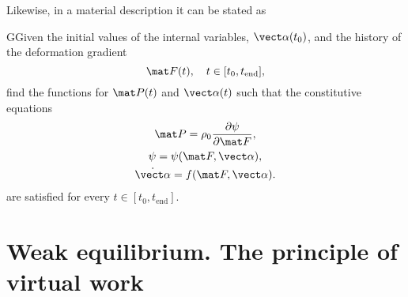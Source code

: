 Likewise, in a material description it can be stated as
    \begin{problem}
    GGiven the initial values of the internal variables, $\vect \alpha(t_0)$, and the history of the deformation gradient
    \begin{equation}
        \mat F(t),\quad t\in[t_0,t_\text{end}],
    \end{equation}
    find the functions for $\mat P(t)$ and $\vect \alpha(t)$ such that the constitutive equations
    \begin{gather}
        \mat P = \rho_0 \frac{\partial \psi}{\partial \mat F},\\
        \psi = \psi(\mat F, \vect \alpha),\\
        \dot{\vect \alpha} = f(\mat F, \vect \alpha).
    \end{gather}
    are satisfied for every $t\in [t_0, t_\text{end}]$.
    \end{problem}

\section{Weak equilibrium. The principle of virtual work}

